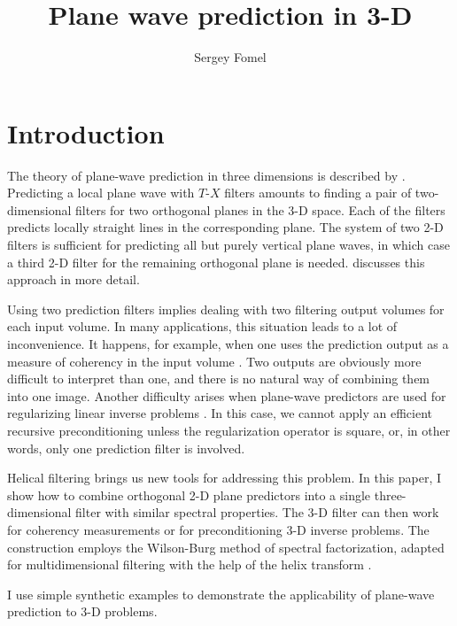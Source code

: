 
\title{Plane wave prediction in 3-D}


\author{Sergey Fomel}

\section{Introduction}

The theory of plane-wave prediction in three dimensions is described
by . Predicting a
local plane wave with $T$-$X$ filters amounts to finding a pair of
two-dimensional filters for two orthogonal planes in the 3-D space.
Each of the filters predicts locally straight lines in the
corresponding plane. The system of two 2-D filters is sufficient for
predicting all but purely vertical plane waves, in which case a third
2-D filter for the remaining orthogonal plane is needed.
 discusses this approach in more detail.
\par
Using two prediction filters implies dealing with two filtering output
volumes for each input volume. In many applications, this situation
leads to a lot of inconvenience. It happens, for example, when one
uses the prediction output as a measure of coherency in the input
volume \cite{Claerbout.sep.77.19,Schwab.sep.92.29}. Two outputs are
obviously more difficult to interpret than one, and there is no
natural way of combining them into one image. Another difficulty
arises when plane-wave predictors are used for regularizing linear
inverse problems \cite{Clapp.sep.95.bob1}. In this case, we cannot
apply an efficient recursive preconditioning
\cite{Claerbout.sep.97.jon2} unless the regularization operator is
square, or, in other words, only one prediction filter is involved.
\par
Helical filtering \cite{helix} brings us new tools for addressing this
problem. In this paper, I show how to combine orthogonal 2-D plane
predictors into a single three-dimensional filter with similar
spectral properties. The 3-D filter can then work for coherency
measurements or for preconditioning 3-D inverse problems.  The
construction employs the Wilson-Burg method of spectral
factorization, adapted for multidimensional filtering with the help of
the helix transform \cite{Sava.sep.97.paul1}.
\par
I use simple synthetic examples to demonstrate the applicability of 
plane-wave prediction to 3-D problems.

